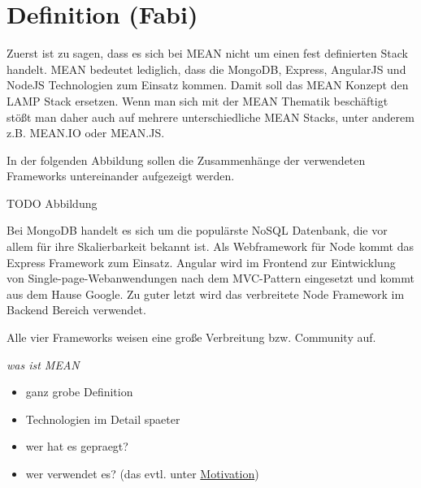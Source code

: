 \section{Definition (Fabi)}
\label{definition-fabi}

Zuerst ist zu sagen, dass es sich bei MEAN nicht um einen fest definierten Stack handelt. MEAN bedeutet lediglich, dass die MongoDB, Express, AngularJS und NodeJS Technologien zum Einsatz kommen. Damit soll das MEAN Konzept den LAMP Stack ersetzen. Wenn man sich mit der MEAN Thematik beschäftigt stößt man daher auch auf mehrere unterschiedliche MEAN Stacks, unter anderem z.B. MEAN.IO oder MEAN.JS.

In der folgenden Abbildung sollen die Zusammenhänge der verwendeten Frameworks untereinander aufgezeigt werden.

TODO Abbildung

Bei MongoDB handelt es sich um die populärste NoSQL Datenbank, die vor allem für ihre Skalierbarkeit bekannt ist. Als Webframework für Node kommt das Express Framework zum Einsatz. Angular wird im Frontend zur Eintwicklung von Single-page-Webanwendungen nach dem MVC-Pattern eingesetzt und kommt aus dem Hause Google. Zu guter letzt wird das verbreitete Node Framework im Backend Bereich verwendet.

Alle vier Frameworks weisen eine große Verbreitung bzw. Community auf.

\emph{was ist MEAN}

\begin{itemize}
\itemsep1pt\parskip0pt
\item
  ganz grobe Definition
\item
  Technologien im Detail spaeter
\item
  wer hat es gepraegt?
\item
  wer verwendet es? (das evtl. unter \hyperref[motivation]{Motivation})
\end{itemize}
